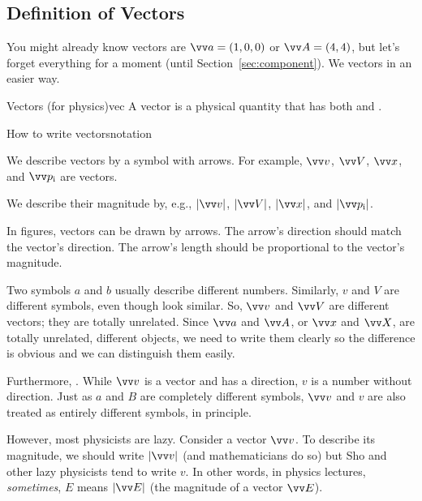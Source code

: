 \documentclass[11pt,pdfa,lastpage]{MishoNote}
\begin{document}
\subsection{Definition of Vectors}
You might already know vectors are $\vc a=(1,0,0)$ or $\vc A=(4,4)$, but let's forget everything for a moment (until Section~\ref{sec:component}).
We  vectors in an easier way.

\begin{definition}{Vectors (for physics)}{vec}
  A vector is a physical quantity that has both  and .
\end{definition}
\begin{definition}{How to write vectors}{notation}
\begin{miniitemize}
\item We describe vectors by a symbol with arrows. For example, $\vc v$, $\vc V$, $\vc x$, and $\vc p\w i$ are vectors.%
\item We describe their magnitude by, e.g., $|\vc v|$, $|\vc V|$, $|\vc x|$, and $|\vc p\w i|$.
  \item In figures, vectors can be drawn by arrows. The arrow's direction should match the vector's direction. The arrow's length should be proportional to the vector's magnitude.
\end{miniitemize}
\end{definition}
\OutputNote

Two symbols $a$ and $b$ usually describe different numbers. Similarly, $v$ and $V$ are different symbols, even though look similar. So, $\vc v$ and $\vc V$ are different vectors; they are totally unrelated. Since $\vc a$ and $\vc A$, or $\vc x$ and $\vc X$, are totally unrelated, different objects, we need to write them clearly so the difference is obvious and we can distinguish them easily.




Furthermore, .
While $\vc v$ is a vector and has a direction, $v$ is a number without direction.
Just as $a$ and $B$ are completely different symbols, $\vc v$ and $v$ are also treated as entirely different symbols, in principle.

However, most physicists are lazy. Consider a vector $\vc v$. To describe its magnitude, we should write $|\vc v|$ (and mathematicians do so) but Sho and other lazy physicists tend to write $v$. In other words, in physics lectures, \emph{sometimes}, $E$ means $|\vc E|$ (the magnitude of a vector $\vc E$).
\end{document}
